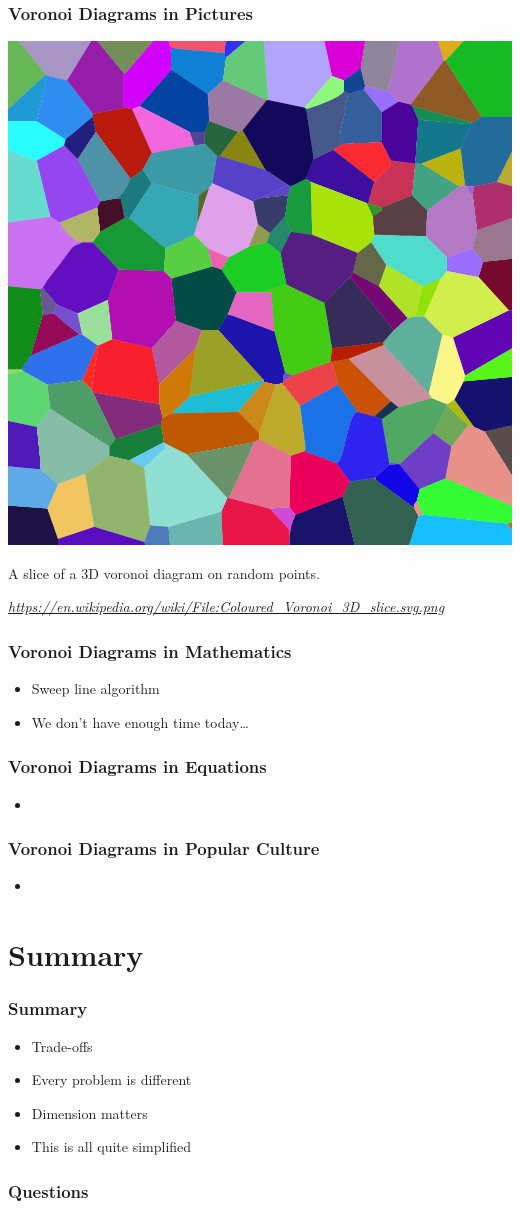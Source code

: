 \documentclass{beamer}
\newcommand\smallgray[1]{\textcolor{gray}{\small\it #1}}
\begin{document}
\begin{frame}
  \frametitle{Voronoi Diagrams in Pictures}

  \includegraphics[width=.6\textwidth]{Coloured_Voronoi_3D_slice.png}

  A slice of a 3D voronoi diagram on random points.

  \smallgray{\url{https://en.wikipedia.org/wiki/File:Coloured_Voronoi_3D_slice.svg.png}}
\end{frame}

\begin{frame}
  \frametitle{Voronoi Diagrams in Mathematics}

  \begin{itemize}
  \item Sweep line algorithm
  \item We don't have enough time today\dots
  \end{itemize}
\end{frame}

\begin{frame}
  \frametitle{Voronoi Diagrams in Equations}

  \begin{itemize}
  \item 
  \end{itemize}
\end{frame}

\begin{frame}
  \frametitle{Voronoi Diagrams in Popular Culture}

  \begin{itemize}
  \item 
  \end{itemize}
\end{frame}

\section*{Summary}

\begin{frame}
  \frametitle{Summary}  

  \begin{itemize}
  \item Trade-offs
  \item Every problem is different
  \item Dimension matters
  \item This is all quite simplified
  \end{itemize}
\end{frame}

\begin{frame}
  \frametitle{Questions}  
\end{frame}
\end{document}

